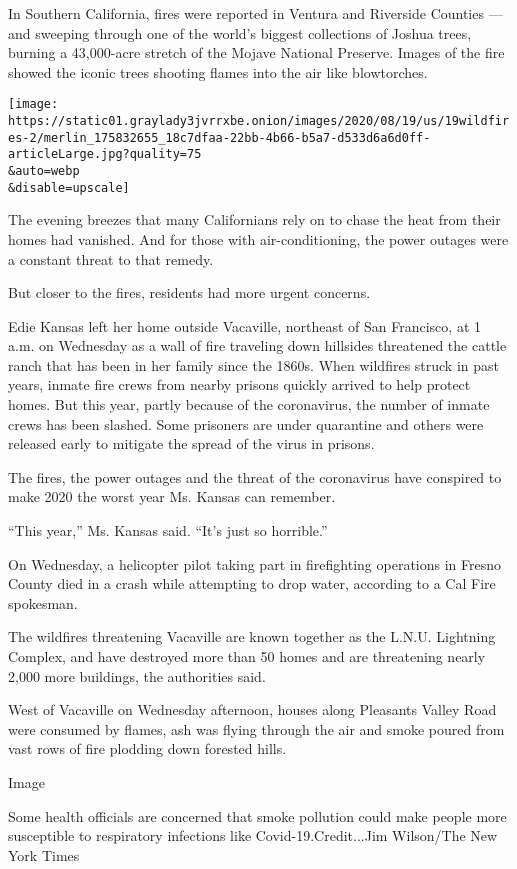 In Southern California, fires were reported in Ventura and Riverside
Counties --- and sweeping through one of the world's biggest collections
of Joshua trees, burning a 43,000-acre stretch of the Mojave National
Preserve. Images of the fire showed the iconic trees shooting flames
into the air like blowtorches.

\texttt{[image: https://static01.graylady3jvrrxbe.onion/images/2020/08/19/us/19wildfires-2/merlin\_175832655\_18c7dfaa-22bb-4b66-b5a7-d533d6a6d0ff-articleLarge.jpg?quality=75\\\&auto=webp\\\&disable=upscale]}

The evening breezes that many Californians rely on to chase the heat
from their homes had vanished. And for those with air-conditioning, the
power outages were a constant threat to that remedy.

But closer to the fires, residents had more urgent concerns.

Edie Kansas left her home outside Vacaville, northeast of San Francisco,
at 1 a.m. on Wednesday as a wall of fire traveling down hillsides
threatened the cattle ranch that has been in her family since the 1860s.
When wildfires struck in past years, inmate fire crews from nearby
prisons quickly arrived to help protect homes. But this year, partly
because of the coronavirus, the number of inmate crews has been slashed.
Some prisoners are under quarantine and others were released early to
mitigate the spread of the virus in prisons.

The fires, the power outages and the threat of the coronavirus have
conspired to make 2020 the worst year Ms. Kansas can remember.

``This year,'' Ms. Kansas said. ``It's just so horrible.''

On Wednesday, a helicopter pilot taking part in firefighting operations
in Fresno County died in a crash while attempting to drop water,
according to a Cal Fire spokesman.

The wildfires threatening Vacaville are known together as the L.N.U.
Lightning Complex, and have destroyed more than 50 homes and are
threatening nearly 2,000 more buildings, the authorities said.

West of Vacaville on Wednesday afternoon, houses along Pleasants Valley
Road were consumed by flames, ash was flying through the air and smoke
poured from vast rows of fire plodding down forested hills.

Image

 Some health officials are concerned that smoke pollution could make
people more susceptible to respiratory infections like
Covid-19.Credit...Jim Wilson/The New York Times

